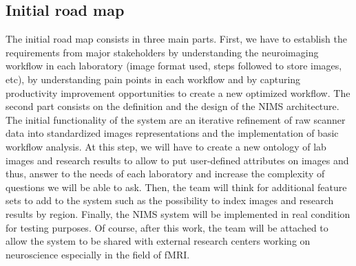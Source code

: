 \subsection{Initial road map}
\par
The initial road map consists in three main parts. First, we have to establish the requirements from major stakeholders by understanding the neuroimaging workflow in each laboratory (image format used, steps followed to store images, etc), by understanding pain points in each workflow and by capturing productivity improvement opportunities to create a new optimized workflow. The second part consists on the definition and the design of the NIMS architecture. The initial functionality of the system are an iterative refinement of raw scanner data into standardized images representations and the implementation of basic workflow analysis. At this step, we will have to create a new ontology of lab images and research results to allow to put user-defined attributes on images and thus, answer to the needs of each laboratory and increase the complexity of questions we will be able to ask. Then, the team will think for additional feature sets to add to the system such as the possibility to index images and research results by region. Finally, the NIMS system will be implemented in real condition for testing purposes. Of course, after this work, the team will be attached to allow the system to be shared with external research centers working on neuroscience especially in the field of fMRI.






